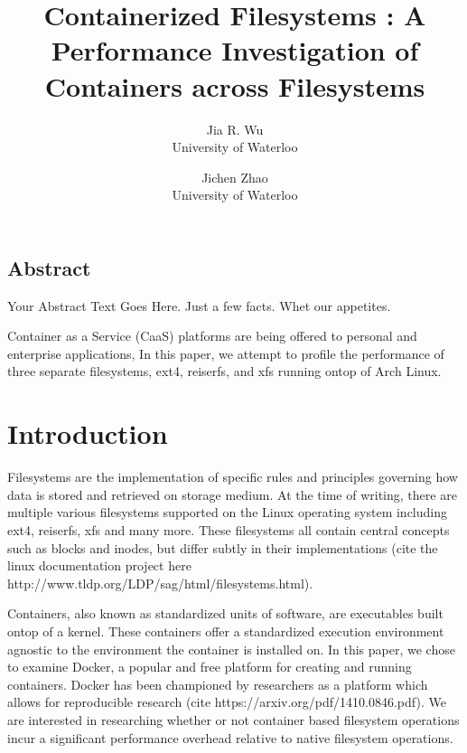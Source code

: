 \documentclass[letterpaper,twocolumn,10pt]{article}
\begin{document}
\date{}

\title{\Large \bf Containerized Filesystems : A Performance Investigation of Containers across Filesystems}

\author{
{\rm Jia R. Wu}\\
University of Waterloo
\and
{\rm Jichen Zhao}\\
University of Waterloo
} %

\maketitle

\thispagestyle{empty}


\subsection*{Abstract}
Your Abstract Text Goes Here.  Just a few facts.
Whet our appetites.

Container as a Service (CaaS) platforms are being offered to personal and enterprise applications,  
In this paper, we attempt to profile the performance of three separate filesystems, ext4, reiserfs, and xfs running ontop of Arch Linux.



\section{Introduction}
Filesystems are the implementation of specific rules and principles governing how data is stored and retrieved on storage medium. At the time of writing, there are multiple various filesystems supported on the Linux operating system including ext4, reiserfs, xfs and many more. These filesystems all contain central concepts such as blocks and inodes, but differ subtly in their implementations (cite the linux documentation project here http://www.tldp.org/LDP/sag/html/filesystems.html).

Containers, also known as standardized units of software, are executables built ontop of a kernel. These containers offer a standardized execution environment agnostic to the environment the container is installed on. In this paper, we chose to examine Docker, a popular and free platform for creating and running containers. Docker has been championed by researchers as a platform which allows for reproducible research (cite https://arxiv.org/pdf/1410.0846.pdf). We are interested in researching whether or not container based filesystem operations incur a significant performance overhead relative to native filesystem operations.
\end{document}
